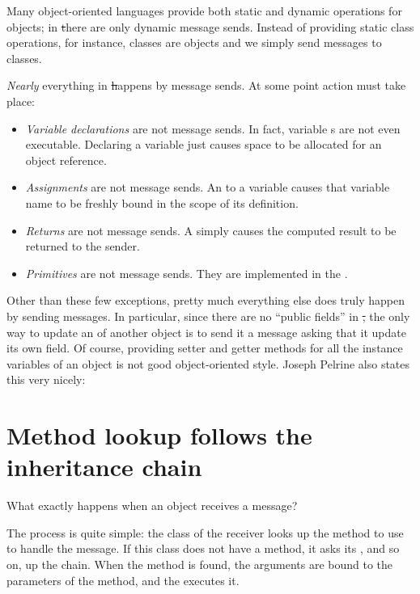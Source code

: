 \documentclass[a4paper,10pt,twoside]{book}
\begin{document}
Many object-oriented languages provide both static and dynamic operations for objects; in \st there are only dynamic message sends. Instead of providing static class operations, for instance, classes are objects and we simply send messages to classes.

\emph{Nearly} everything in \st happens by message sends.
At some point action must take place:
\begin{itemize}
  \item \emph{Variable declarations} are not message sends.
  		In fact, variable s are not even executable.
  		Declaring a variable just causes space to be allocated for an object reference.
  \item \emph{Assignments} are not message sends.
  		An  to a variable causes that variable name to be freshly bound in the scope of its definition.
  \item \emph{Returns} are not message sends.
  		A  simply causes the computed result to be returned to the sender.
  \item \emph{Primitives} are not message sends.
  		They are implemented in the .
\end{itemize}
Other than these few exceptions, pretty much everything else does truly happen by sending messages.
In particular, since there are no ``public fields'' in \st, the only way to update an  of another object is to send it a message asking that it update its own field.
Of course, providing setter and getter methods for all the instance variables of an object is not good object-oriented style.
Joseph Pelrine also states this very nicely:

\section{Method lookup follows the inheritance chain} 


What exactly happens when an object receives a message?

The process is quite simple:
the class of the receiver looks up the method to use to handle the message.
If this class does not have a method, it asks its , and so on, up the  chain.
When the method is found, the arguments are bound to the parameters of the method, and the  executes it.
\end{document}
